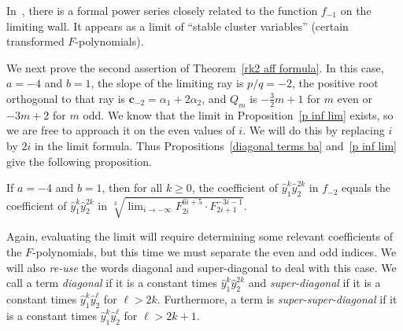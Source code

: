 \documentclass[ALCO,ThmDefs,Unicode,epreuves]{cedram}
\newcommand{\newword}[1]{\emph{#1}}
\newcommand{\p}{{\mathfrak p}}
\newcommand{\cc}{\mathbf{c}}
\newcommand{\hy}{\hat{y}}
\begin{document}
\begin{rema}\label{UMN REU}
In~\cite{Zhang}, there is a formal power series closely related to the function $f_{-1}$ on the limiting wall.
It appears as a limit of ``stable cluster variables'' (certain transformed $F$-polynomials). 
\end{rema}

We next prove the second assertion of Theorem~\ref{rk2 aff formula}.
In this case, $a=-4$ and $b=1$, the slope of the limiting ray is $p/q=-2$, the positive root orthogonal to that ray is $\cc_{-2}=\alpha_1+2\alpha_2$, and $Q_m$ is $-\frac32m+1$ for $m$ even or $-3m+2$ for $m$ odd.
We know that the limit in Proposition~\ref{p inf lim} exists, so we are free to approach it on the even values of $i$.
We will do this by replacing $i$ by $2i$ in the limit formula.
Thus Propositions~\ref{diagonal terms ba} and~\ref{p inf lim} give the following proposition.
\begin{prop}\label{diagonal terms asym}
If $a=-4$ and $b=1$, then for all $k\ge0$, the coefficient of $\hy_1^k\hy_2^{2k}$ in $f_{-2}$ equals the coefficient of $\hy_1^k\hy_2^{2k}$ in $\sqrt[3]{\lim_{i\to-\infty}F_{2i}^{6i+5}\cdot F_{2i+1}^{-3i-1}}$.
\end{prop}

Again, evaluating the limit will require determining some relevant coefficients of the $F$-polynomials, but this time we must separate the even and odd indices.
We will also \emph{re-use} the words diagonal and super-diagonal to deal with this case.
We call a term \newword{diagonal} if it is a constant times $\hy_1^k\hy_2^{2k}$ and \newword{super-diagonal} if it is a constant times $\hy_1^k\hy_2^\ell$ for $\ell>2k$.
Furthermore, a term is \newword{super-super-diagonal} if it is a constant times $\hy_1^k\hy_2^\ell$ for $\ell>2k+1$.
\end{document}
